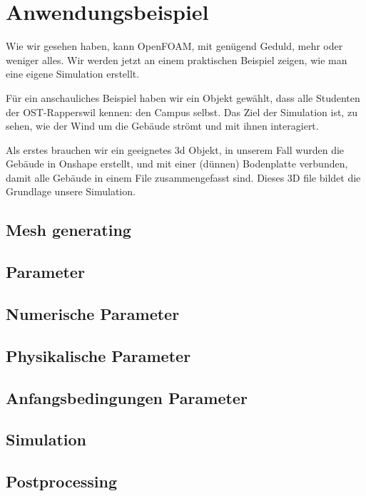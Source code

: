 %
%
%
%
\section{Anwendungsbeispiel
\label{openfoam:section:teil3}}
Wie wir gesehen haben, kann OpenFOAM, mit genügend Geduld, mehr oder weniger alles. 
Wir werden jetzt an einem praktischen Beispiel zeigen, wie man eine eigene Simulation erstellt.

Für ein anschauliches Beispiel haben wir ein Objekt gewählt, dass alle Studenten der OST-Rapperswil kennen: den Campus selbst.
Das Ziel der Simulation ist, zu sehen, wie der Wind um die Gebäude strömt und mit ihnen interagiert.

Als erstes brauchen wir ein geeignetes 3d Objekt, in unserem Fall wurden die Gebäude in Onshape erstellt, und mit einer (dünnen) Bodenplatte verbunden, damit alle Gebäude in einem File zusammengefasst sind.
Dieses 3D file bildet die Grundlage unsere Simulation.


\subsection{Mesh generating\label{openfoam:section:Mesh generating}}
\subsection{Parameter\label{openfoam:section:Parameter}}
\subsection{Numerische Parameter\label{openfoam:section:Numerische Parameter}}
\subsection{Physikalische Parameter\label{openfoam:section:Physikalische Parameter}}
\subsection{Anfangsbedingungen Parameter\label{openfoam:section:Anfangsbedingungen Parameter}}
\subsection{Simulation\label{openfoam:section:Simulation}}
\subsection{Postprocessing\label{openfoam:section:Postprocessing}}


